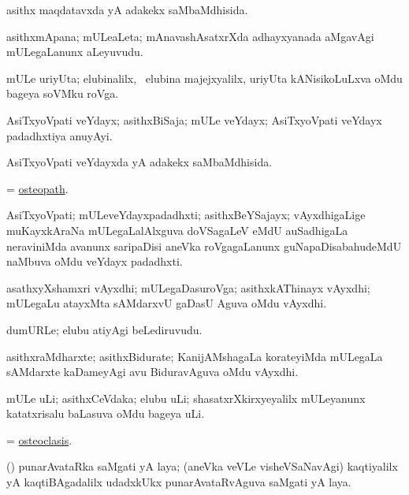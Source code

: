 \bentry
{}
\gl{\gu}
\bmng
asithx maqdatavxda yA adakekx saMbaMdhisida. 
\emng
\eentry

\bentry
{}
\gl{\nA}
\bmng
asithxmApana; mULeaLeta; mAnavashAsatxrXda adhayxyanada aMgavAgi mULegaLanunx aLeyuvudu. 
\emng
\eentry

\bentry
{}
\gl{\nA}
\bmng
mULe uriyUta; elubinalilx, \kanmu\ elubina majejxyalilx, uriyUta kANisikoLuLxva oMdu bageya soVMku roVga. 
\emng
\eentry

\bentry
{}
\gl{\nA}
\bmng
AsiTxyoVpati veYdayx; asithxBiSaja; mULe veYdayx; AsiTxyoVpati veYdayx padadhxtiya anuyAyi. 
\emng
\eentry

\bentry
{}
\gl{\gu}
\bmng
AsiTxyoVpati veYdayxda yA adakekx saMbaMdhisida. 
\emng
\eentry

\bentry
{}
\gl{\nA}
\bmng
= \hyperlink{osteopath}{osteopath}. 
\emng
\eentry

\bentry
{}
\gl{\nA}
\bmng
AsiTxyoVpati; mULeveYdayxpadadhxti; asithxBeYSajayx; vAyxdhigaLige muKayxkAraNa mULegaLalAlxguva doVSagaLeV eMdU auSadhigaLa neraviniMda avanunx saripaDisi aneVka roVgagaLanunx guNapaDisabahudeMdU naMbuva oMdu veYdayx padadhxti. 
\emng
\eentry

\bentry
{}
\gl{\nA}
\bmng
asathxyXshamxri vAyxdhi; mULegaDasuroVga; asithxkAThinayx vAyxdhi; mULegaLu atayxMta sAMdarxvU gaDasU Aguva oMdu vAyxdhi. 
\emng
\eentry

\bentry
{}
\gl{\nA}
\bmng
dumURLe; elubu atiyAgi beLediruvudu. 
\emng
\eentry

\bentry
{}
\gl{\nA}
\bmng
asithxraMdharxte; asithxBidurate; KanijAMshagaLa korateyiMda mULegaLa sAMdarxte kaDameyAgi avu BiduravAguva oMdu vAyxdhi. 
\emng
\eentry

\bentry
{}
\gl{\nA}
\bmng
mULe uLi; asithxCeVdaka; elubu uLi; shasatxrXkirxyeyalilx mULeyanunx katatxrisalu baLasuva oMdu bageya uLi. 
\emng
\eentry

\bentry
{}
\gl{\nA}
\bmng
= \hyperlink{osteoclasis}{osteoclasis}. 
\emng
\eentry

\bentry
{}
\gl{\nA}
\bmng
(\saM) punarAvataRka saMgati yA laya; (aneVka veVLe visheVSaNavAgi) kaqtiyalilx yA kaqtiBAgadalilx udadxkUkx punarAvataRvAguva saMgati yA laya. 
\emng
\eentry

